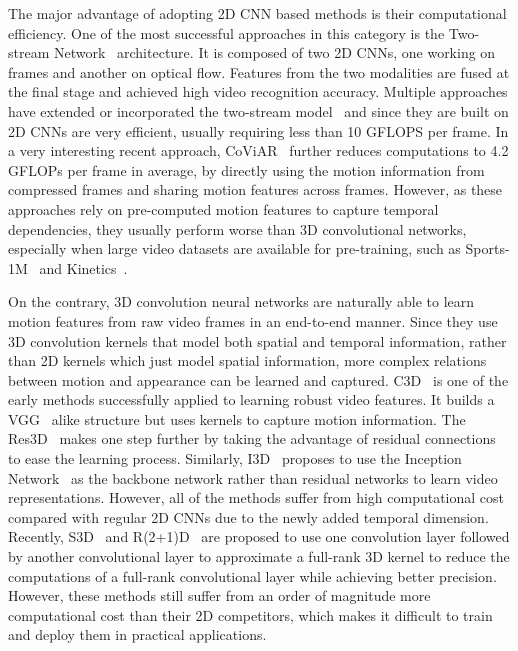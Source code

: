 \documentclass[runningheads]{llncs}
\begin{document}
The major advantage of adopting 2D CNN based methods is their computational efficiency. One of the most successful approaches in this category is the Two-stream Network~\cite{simonyan2014two} architecture. It is composed of two 2D CNNs, one working on frames and another on optical flow. Features from the two modalities are fused at the final stage and achieved high video recognition accuracy. Multiple approaches have extended or incorporated the two-stream model~\cite{feichtenhofer2016convolutional,ng2015beyond,wang2017appearance,tran2017two} and since they are built on 2D CNNs are very efficient, usually requiring less than 10 GFLOPS per frame. In a very interesting recent approach, CoViAR~\cite{wu2017compressed} further reduces computations to 4.2 GFLOPs per frame in average, by directly using the motion information from compressed frames and sharing motion features across frames. However, as these approaches rely on pre-computed motion features to capture temporal dependencies, they usually perform worse than 3D convolutional networks, especially when large video datasets are available for pre-training, such as Sports-1M~\cite{KarpathyCVPR14} and Kinetics~\cite{kay2017kinetics}.
\nocite{zheng_eccv18_autoloc,zheng_eccv18_oad}

On the contrary, 3D convolution neural networks are naturally able to learn motion features from raw video frames in an end-to-end manner. Since they use 3D convolution kernels that model both spatial and temporal information, rather than 2D kernels which just model spatial information, more complex relations between motion and appearance can be learned and captured. C3D~\cite{tran2015learning} is one of the early methods successfully applied to learning robust video features. It builds a VGG~\cite{simonyan2014very} alike structure but uses  kernels to capture motion information. The Res3D~\cite{tran2017convnet} makes one step further by taking the advantage of residual connections to ease the learning process. Similarly, I3D~\cite{carreira2017quo} proposes to use the Inception Network~\cite{szegedy2015going} as the backbone network rather than residual networks to learn video representations. However, all of the methods suffer from high computational cost compared with regular 2D CNNs due to the newly added temporal dimension. Recently, S3D~\cite{xie2017rethinking} and R(2+1)D~\cite{tran2017closer} are proposed to use one  convolution layer followed by another  convolutional layer to approximate a full-rank 3D kernel to reduce the computations of a full-rank  convolutional layer while achieving better precision. However, these methods still suffer from an order of magnitude more computational cost than their 2D competitors, which makes it difficult to train and deploy them in practical applications.
\end{document}
